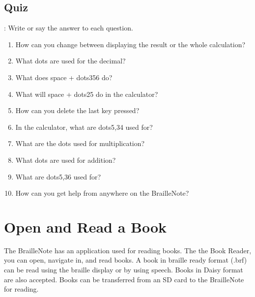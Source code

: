 \documentclass[10pt,letterpaper,twoside]{report}
\begin{document}
\subsection{Quiz}:
Write or say the answer to each question.
\begin{enumerate}
	\item How can you change between displaying the result or the whole calculation?
	\item What dots are used for the decimal?
	\item What does space + dots356 do?
	\item What will space + dots25 do in the calculator?
	\item How can you delete the last key pressed?
	\item In the calculator, what are dots5,34 used for?
	\item What are the dots used for multiplication?
	\item What dots are used for addition?
	\item What are dots5,36 used for?
	\item How can you get help from anywhere on the BrailleNote?
\end{enumerate}
\clearpage
\section{Open and Read a Book}
The BrailleNote has an application used for reading books. The the Book Reader, you can open, navigate in, and read books. A book in braille ready format (.brf) can be read using the braille display or by using speech. Books in Daisy format are also accepted. Books can be transferred from an SD card to the BrailleNote for reading.
\end{document}

